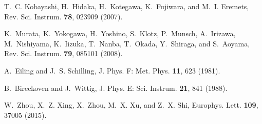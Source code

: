 \documentclass [letter,twocolumn]{jpsj3}
\begin{document}
\begin{thebibliography}{10}
T.~C. Kobayashi, H.~Hidaka, H.~Kotegawa, K.~Fujiwara, and M.~I. Eremets, 
Rev. Sci. Instrum. {\bfseries 78},  023909 (2007).

K.~Murata, K.~Yokogawa, H.~Yoshino, S.~Klotz, P.~Munsch, A.~Irizawa, M.~Nishiyama, K.~Iizuka, T.~Nanba, T.~Okada, Y.~Shiraga, and S.~Aoyama, 
Rev. Sci. Instrum. {\bfseries 79},  085101 (2008).

A.~Eiling and J.~S. Schilling, J. Phys. F: Met. Phys. {\bfseries 11}, 623 (1981).

B.~Bireckoven and J.~Wittig, J. Phys. E: Sci. Instrum. {\bfseries 21}, 841 (1988).

W.~Zhou, X.~Z. Xing, X.~Zhou, M.~X. Xu, and Z.~X. Shi, Europhys. Lett. {\bfseries 109}, 37005 (2015).

\end{thebibliography}
\end{document}
